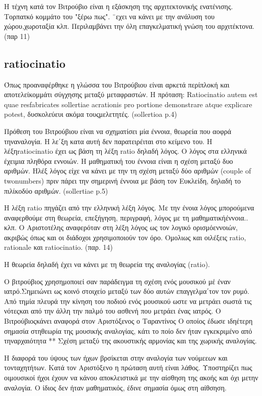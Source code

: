 Η τέχνη κατά τον Βιτρούβιο είναι η εξάσκηση της αρχιτεκτονικής ενατένισης. Τορπατκό κομμάτο του "ξέρω πως". ¨εχει να κάνει με την ανάλυση του χώρου,χωροταξία κλπ. Περιλαμβάνει την όλη επαγκελματική γνώση του αρχιτέκτονα. (παρ
11)

\subsection{ratiocinatio}

Όπως προαναφέρθηκε η γλώσσα του Βιτρούβιου είναι αρκετά περίπλοκή και αποτελείκομμάτι σύγχησης μεταξύ μεταφραστών. Η πρόταση:  Ratiocinatio autem est quae resfabricates sollertiae acrationis pro portione demonstrare atque explicare potest, δυσκολεύευι ακόμα τουςμελετητές. (sollertioa p.4)

Πρόθεση του Βιτρούβιου είναι να σχηματίσει μία έννοια, θεωρεία που αοφρά τηναναλογία. Η λε΄ξη κατα αυτή δεν παρατειρέιται στο κείμενο του. Η λέξηratiocinatio έχει ως βάση τη λέξη ratio δηλαδή λόγος. Ο λόγος στα ελληνικά έχειμια πληθόρα εννοιών. Η μαθηματική του έννοια είναι η σχέση μεταξύ δυο αριθμών. Ηλέξ λόγος είχε να κάνει με την τη σχέση μεταξύ δύο αριθμών (couple of twonumbers) πριν πάρει την σημερινή έννοια με βάση τον Ευκλείδη, δηλαδή το πιλίκοδύο αριθμών. (sollertiae p.5)

Η λέξη ratio πηγάζει από την ελληνική λέξη λόγος. Με την ένοια λόγος μπορούμενα αναφερθούμε στη θεωρεία, επεξήγηση, περιγραφή, λόγος με τη μαθηματικήέννοια.. κλπ. Ο Αριστοτέλης αναφερόταν στη λέξη λόγος ως τον λογικό ορισμόεννοιών, ακριβώς όπως και οι διάδοχοι χρησιμοποιούν τον όρο. Ομολιως και οιλέξεις ratio, rationale και ratiocinatio. (παρ. 14)

Η θεωρεία δηλαδή έχει να κάνει με τη θεωρεία της αναλογίας (ratio). 

Ο βιτρούβιος χρησημοποιεί σαν παράδειγμα τη σχέση ενός μουσικού μέ έναν ιατρό.Σημειώνει ως κοινό στοιχείο μεταξύ των δύο αυτών επαγγελμα΄τον τον ρυμό. Από τημία πλευρά την κίνηση του ποδιού ενός μουσικού ωστε να μετράει σωστά τις νότεςκαι από την άλλη την παλμό του ασθενή που μετράει ένας ιατρός. Ο Βιτρούβιοςκάνει αναφορά στον Αριστόξενος ο Ταραντίνος Ο οποίος έδωσε ιδηέτερη σημασία στηθεωρία της μουσικής αναλογίας, κάτι το ποίο δεν ήταν εγκεκριμένο από τηναρχαιότητα ** Σχέση μεταξύ της ακουστικής αρμονίας και της χωρικής αναλογίας. 

Η διαφορά του ύψους των ήχων βρσίκεται στην αναλογία των νούμεεων και τονταχητήτων. Κατά τον Αριστόξενο η πρώταση αυτή είναι λάθος. Υποστηρίζει πως οιμουσικοί ήχοι έχουν να κάνου αποκλειστικά με την αίσθηση της ακοής και όχι μετην αναλογία. Ο ίδιος δεν ήταν μαθηματικός, έδινε σημασία όμως στη αίθσηση. 


